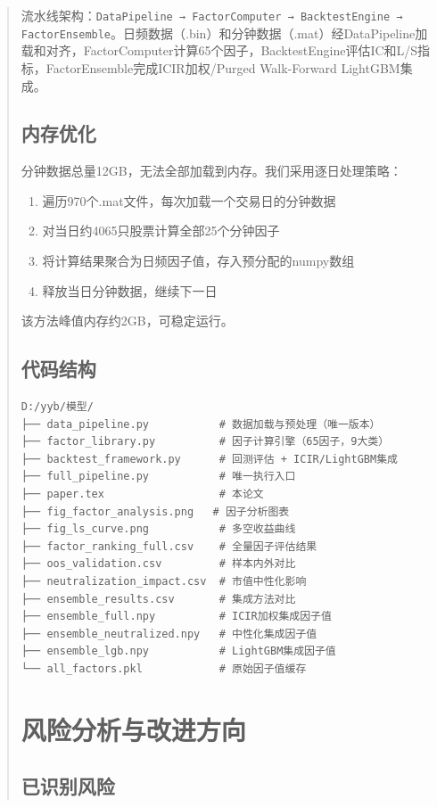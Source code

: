\documentclass[12pt,a4paper]{article}
\begin{document}
\begin{abstract}
流水线架构：\texttt{DataPipeline → FactorComputer → BacktestEngine → FactorEnsemble}。日频数据（.bin）和分钟数据（.mat）经DataPipeline加载和对齐，FactorComputer计算65个因子，BacktestEngine评估IC和L/S指标，FactorEnsemble完成ICIR加权/Purged Walk-Forward LightGBM集成。

\subsection{内存优化}
分钟数据总量12GB，无法全部加载到内存。我们采用逐日处理策略：
\begin{enumerate}[label=(\arabic*)]
    \item 遍历970个.mat文件，每次加载一个交易日的分钟数据
    \item 对当日约4065只股票计算全部25个分钟因子
    \item 将计算结果聚合为日频因子值，存入预分配的numpy数组
    \item 释放当日分钟数据，继续下一日
\end{enumerate}
该方法峰值内存约2GB，可稳定运行。

\subsection{代码结构}
\begin{verbatim}
D:/yyb/模型/
├── data_pipeline.py           # 数据加载与预处理（唯一版本）
├── factor_library.py          # 因子计算引擎（65因子，9大类）
├── backtest_framework.py      # 回测评估 + ICIR/LightGBM集成
├── full_pipeline.py           # 唯一执行入口
├── paper.tex                  # 本论文
├── fig_factor_analysis.png   # 因子分析图表
├── fig_ls_curve.png           # 多空收益曲线
├── factor_ranking_full.csv    # 全量因子评估结果
├── oos_validation.csv         # 样本内外对比
├── neutralization_impact.csv  # 市值中性化影响
├── ensemble_results.csv       # 集成方法对比
├── ensemble_full.npy          # ICIR加权集成因子值
├── ensemble_neutralized.npy   # 中性化集成因子值
├── ensemble_lgb.npy           # LightGBM集成因子值
└── all_factors.pkl            # 原始因子值缓存
\end{verbatim}

\section{风险分析与改进方向}

\subsection{已识别风险}


\end{abstract}
\end{document}
